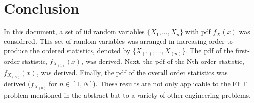 \documentclass[conference]{IEEEtran}
\begin{document}
%
%
\section{Conclusion}
In this document, a set of iid random variables $\{X_1,...,X_n\}$ with pdf $f_X(x)$ was considered. This set of random variables was arranged in increasing order to produce the ordered statistics, denoted by $\{X_{(1)},...,X_{(n)}\}$. The pdf of the first-order statistic, $f_{X_{(1)}}(x)$, was derived. Next, the pdf of the Nth-order statistic, $f_{X_{(N)}}(x)$, was derived. Finally, the pdf of the overall order statistics was derived ($f_{X_{(n)}}$ for $n\in[1,N]$). These results are not only applicable to the FFT problem mentioned in the abstract but to a variety of other engineering problems.
\end{document}
